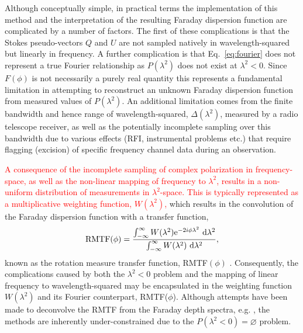 \documentclass[fleqn,usenatbib]{mnras}
\begin{document}
Although conceptually simple, in practical terms the implementation of this method and the interpretation of the resulting Faraday dispersion function are complicated by a number of factors. The first of these complications is that the Stokes pseudo-vectors $Q$ and $U$ are not sampled natively in wavelength-squared but linearly in frequency. A further complication is that Eq.~\ref{eq:fourier} does not represent a true Fourier relationship as $P(\lambda^2)$ does not exist at $\lambda^2 < 0$. Since $F(\phi)$ is not necessarily a purely real quantity this represents a fundamental limitation in attempting to reconstruct an unknown Faraday dispersion function from measured values of $P(\lambda^2)$. An additional limitation comes from the finite bandwidth and hence range of wavelength-squared, $\Delta (\lambda^2)$, measured by a radio telescope receiver, as well as the potentially incomplete sampling over this bandwidth due to various effects (RFI, instrumental problems etc.) that require flagging (excision) of specific frequency channel data during an observation.

\textcolor{red}{A consequence of the incomplete sampling of complex polarization in frequency-space, as well as the non-linear mapping of frequency to $\lambda^2$, results in a non-uniform distribution of measurements in $\lambda^2$-space. This is typically represented as a multiplicative weighting function, $W(\lambda^2)$,} which results in the convolution of the Faraday dispersion function with a transfer function,
%
\begin{equation}
\label{eq:rmtf}
{\rm RMTF}(\phi) = \frac{\int_{-\infty}^{\infty} { W(\lambda^2){\rm e}^{-2i\phi\lambda^2}~{\rm d}\lambda^2 }}{\int_{-\infty}^{\infty} { W(\lambda^2)~{\rm d}\lambda^2 }},
\end{equation}
%
known as the rotation measure transfer function, RMTF$(\phi)$ \citep{2005A&A...441.1217B}. Consequently, the complications caused by both the $\lambda^2 < 0$ problem and the mapping of linear frequency to wavelength-squared may be encapsulated in the weighting function $W(\lambda^2)$ and its Fourier counterpart, RMTF($\phi$). Although attempts have been made to deconvolve the RMTF from the Faraday depth spectra, e.g. \cite{2009IAUS..259..591H}, the methods are inherently under-constrained due to the $P(\lambda^2<0) = \varnothing$ problem.
\end{document}
